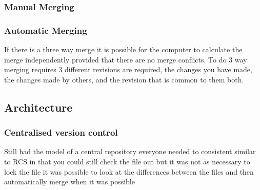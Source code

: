 \subsubsection{Manual Merging}


% 
% 

\subsubsection{Automatic Merging}
If there is a three way merge it is possible for the computer to calculate the merge independently provided that there are no merge conflicts.
To do 3 way merging requires 3 different revisions are required, the changes you have made, the changes made by others, and the revision that is common to them both.


% 

\subsection{Architecture}
\subsubsection{Centralised version control}
Still had the model of a central repository everyone needed to consistent
similar to RCS in that you could still check the file out but it was not as necessary to lock the file
it was possible to look at the differences between the files and then automatically merge when it was possible

